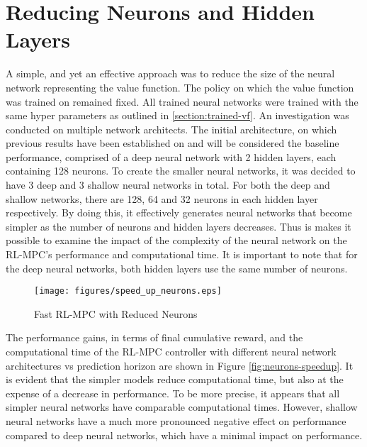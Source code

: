 \section{Reducing Neurons and Hidden Layers}
A simple, and yet an effective approach was to reduce the size of the neural network representing the value function. The policy on which the value function was trained on remained fixed. All trained neural networks were trained with the same hyper parameters as outlined in \autoref{section:trained-vf}. An investigation was conducted on multiple network architects. The initial architecture, on which previous results have been established on and will be considered the baseline performance, comprised of a deep neural network with 2 hidden layers, each containing 128 neurons.
To create the smaller neural networks, it was decided to have 3 deep and 3 shallow neural networks in total. For both the deep and shallow networks, there are 128, 64 and 32 neurons in each hidden layer respectively. By doing this, it effectively generates neural networks that become simpler as the number of neurons and hidden layers decreases. Thus is makes it possible to examine the impact of the complexity of the neural network on the RL-MPC's performance and computational time. It is important to note that for the deep neural networks, both hidden layers use the same number of neurons. 

\begin{figure}[H]
	\centering
	\texttt{[image: figures/speed\_up\_neurons.eps]}
	\caption{Fast RL-MPC with Reduced Neurons}
	\label{fig:neurons-speedup}
\end{figure}

The performance gains, in terms of final cumulative reward, and the computational time of the RL-MPC controller with different neural network architectures vs prediction horizon are shown in Figure \autoref{fig:neurons-speedup}. It is evident that the simpler models reduce computational time, but also at the expense of a decrease in performance. To be more precise, it appears that all simpler neural networks have comparable computational times. However, shallow neural networks have a much more pronounced negative effect on performance compared to deep neural networks, which have a minimal impact on performance.


